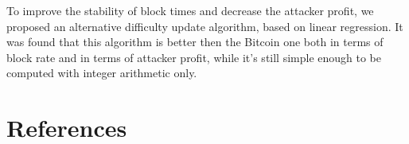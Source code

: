 \documentclass[number,preprint,review]{elsarticle}
\begin{document}
To improve the stability of block times and decrease the attacker profit, we proposed an alternative difficulty update algorithm, based on linear regression.
It was found that this algorithm is better then the Bitcoin one both in terms of block rate and in terms of attacker profit, while it's still simple enough to be computed with integer arithmetic only.

\section*{References}



\end{document}
